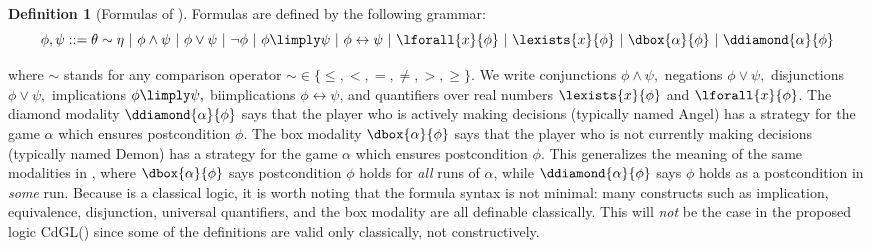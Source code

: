 \documentclass[12pt]{cmuthesis}
\theoremstyle{definition}
\newtheorem{definition}{Definition}
\theoremstyle{remark}
\newcommand{\bebecomes}{\mathrel{::=}}
\newcommand{\alternative}{~|~}
\newcommand{\rref}[2][]{\prettyref{#2}}
\newcommand{\lequiv}{\leftrightarrow}
\newcommand{\CdGL}{\textsf{CdGL}\xspace}
\begin{document}
\begin{definition}[Formulas of \dGL]
  Formulas are defined by the following grammar:
\[\phi,\psi \bebecomes \theta \sim \eta \alternative \phi \land \psi \alternative \phi \lor \psi \alternative \neg \phi \alternative \phi \limply \psi \alternative \phi \lequiv \psi \alternative \lforall{x}{\phi} \alternative \lexists{x}{\phi} \alternative \dbox{\alpha}{\phi} \alternative \ddiamond{\alpha}{\phi}\]
\end{definition}
where $\sim$ stands for any comparison operator $\sim \in \{\leq, <, =, \neq, >, \geq\}$.
We write conjunctions $\phi \land \psi,$ negations $\phi \lor \psi,$ disjunctions $\phi \lor \psi,$ implications $\phi \limply \psi,$ biimplications $\phi \lequiv \psi$, and quantifiers over real numbers $\lexists{x}{\phi}$ and $\lforall{x}{\phi}$.
The diamond modality $\ddiamond{\alpha}{\phi}$ says that the player who is actively making decisions (typically named Angel) has a strategy for the game $\alpha$ which ensures postcondition $\phi$.
The box modality $\dbox{\alpha}{\phi}$ says that the player who is not currently making decisions (typically named Demon) has a strategy for the game $\alpha$ which ensures postcondition $\phi$.
This generalizes the meaning of the same modalities in \dL, where $\dbox{\alpha}{\phi}$ says postcondition $\phi$ holds for \emph{all} runs of $\alpha$, while $\ddiamond{\alpha}{\phi}$ says $\phi$ holds as a postcondition in \emph{some} run.
Because \dGL is a classical logic, it is worth noting that the formula syntax is not minimal: many constructs such as implication, equivalence, disjunction, universal quantifiers, and the box modality are all definable classically.
This will \emph{not} be the case in the proposed logic \CdGL (\rref{ch:cgl}) since some of the definitions are valid only classically, not constructively.
\end{document}
